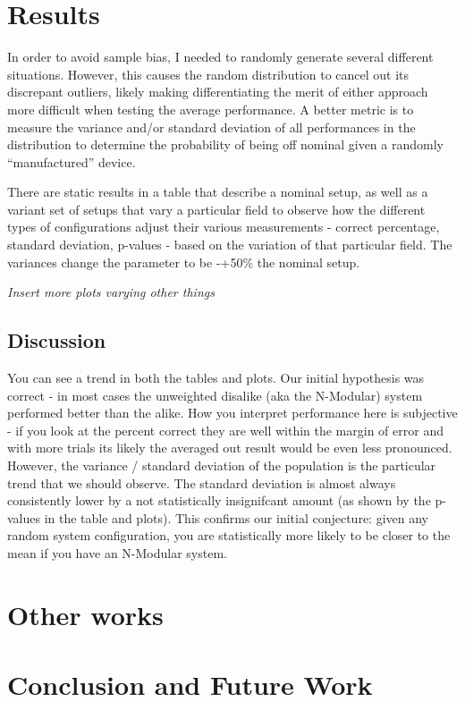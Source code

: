 \documentclass[article]{IEEEtran}
\begin{document}
\section{Results}
In order to avoid sample bias, I needed to randomly generate several different situations. However, this causes the random distribution to cancel out its discrepant outliers, likely making differentiating the merit of either approach more difficult when testing the average performance. A better metric is to measure the variance and/or standard deviation of all performances in the distribution to determine the probability of being off nominal given a randomly “manufactured” device.
\par
There are static results in a table that describe a nominal setup, as well as a variant set of setups that vary a particular field to observe how the different types of configurations adjust their various measurements - correct percentage, standard deviation, p-values - based on the variation of that particular field. The variances change the parameter to be -+50\% the nominal setup.





\textit{Insert more plots varying other things}

\subsection{Discussion}
\par You can see a trend in both the tables and plots. Our initial hypothesis was correct - in most cases the unweighted disalike (aka the N-Modular) system performed better than the alike. How you interpret performance here is subjective - if you look at the percent correct they are well within the margin of error and with more trials its likely the averaged out result would be even less pronounced. However, the variance / standard deviation of the population is the particular trend that we should observe. The standard deviation is almost always consistently lower by a not statistically insignifcant amount (as shown by the p-values in the table and plots). This confirms our initial conjecture: given any random system configuration, you are statistically more likely to be closer to the mean if you have an N-Modular system.

\section{Other works}
\section{Conclusion and Future Work}
\end{document}
